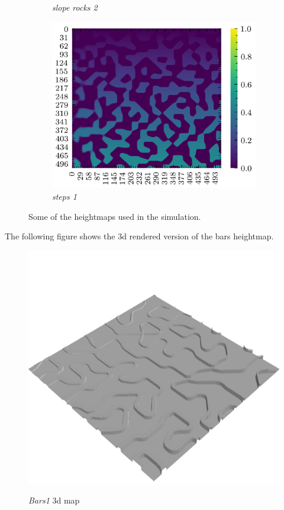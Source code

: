 \documentclass[../document.tex]{subfiles}
\begin{document}
\begin{figure}[H]
\begin{subfigure}[b]{0.3\textwidth}
			\caption{\emph{slope rocks 2}}
	    \end{subfigure}	
	   \begin{subfigure}[b]{0.3\textwidth}
			\includegraphics[width=\textwidth]{../img/hm/steps1.png}
			\caption{\emph{steps 1}}
	    \end{subfigure}	
	\label{fig: heightmaps}
	\caption{Some of the heightmaps used in the simulation.}	
\end{figure}
The following figure shows the 3d rendered version of the bars heightmap.
\begin{figure}[H]
    \includegraphics[width=\textwidth]{../img/hm3d/bars1.png}
	\label{fig: bars1-3d}
	\caption{\emph{Bars1} 3d map}
\end{figure}
\end{document}
